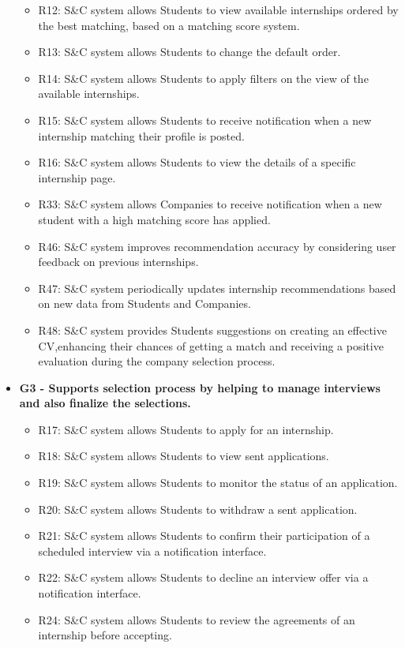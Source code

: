 \begin{itemize}
\begin{itemize}
        \item R12: S\&C system allows Students to view available internships ordered by the best matching, based on a matching score system.
        \item R13: S\&C system allows Students to change the default order.
        \item R14: S\&C system allows Students to apply filters on the view of the available internships.
        \item R15: S\&C system allows Students to receive notification when a new internship matching their profile is posted.
        \item R16: S\&C system allows Students to view the details of a specific internship page.
        \item R33: S\&C system allows Companies to receive notification when a new student with a high matching score has applied.
        \item R46: S\&C system improves recommendation accuracy by considering user feedback on previous internships.
        \item R47: S\&C system periodically updates internship recommendations based on new data from Students and Companies.
        \item R48: S\&C system provides Students suggestions on creating an effective CV,enhancing their chances of getting a match and receiving a positive evaluation during the company selection process.
    \end{itemize}
    \item \textbf{G3 - Supports selection process by helping to manage interviews and also finalize the selections.}
    \begin{itemize}
        \item R17: S\&C system allows Students to apply for an internship.
        \item R18: S\&C system allows Students to view sent applications.
        \item R19: S\&C system allows Students to monitor the status of an application.
        \item R20: S\&C system allows Students to withdraw a sent application.
        \item R21: S\&C system allows Students to confirm their participation of a scheduled interview via a notification interface.
        \item R22: S\&C system allows Students to decline an interview offer via a notification interface.
        \item R24: S\&C system allows Students to review the agreements of an internship before accepting.

\end{itemize}
\end{itemize}
